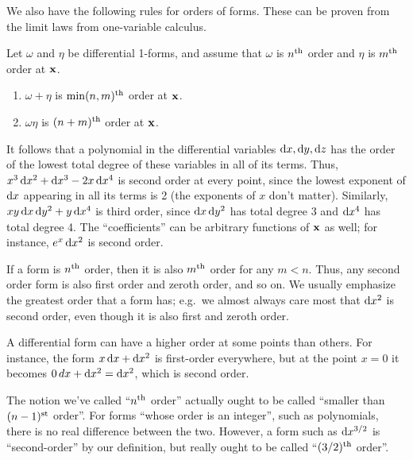 \documentclass[12pt]{amsart}
\begin{document}
We also have the following rules for orders of forms.
These can be proven from the limit laws from one-variable calculus.

\begin{thm}
  Let $\omega$ and $\eta$ be differential 1-forms, and assume that $\omega$ is $n^{\mathrm{th}}$ order and $\eta$ is $m^{\mathrm{th}}$ order at $\mathbf{x}$.
  \begin{enumerate}
  \item $\omega+\eta$ is $\min(n,m)^{\mathrm{th}}$ order at $\mathbf{x}$.
  \item $\omega\eta$ is $(n+m)^{\mathrm{th}}$ order at $\mathbf{x}$.
  \end{enumerate}
\end{thm}

It follows that a polynomial in the differential variables $\mathrm{d} x,\mathrm{d} y,\mathrm{d} z$ has the order of the lowest total degree of these variables in all of its terms.
Thus, $x^3\, \mathrm{d} x^2 + \mathrm{d} x^3 - 2x \,\mathrm{d} x^4$ is second order at every point, since the lowest exponent of $\mathrm{d} x$ appearing in all its terms is 2 (the exponents of $x$ don't matter).
Similarly, $xy\,\mathrm{d} x\,\mathrm{d} y^2 + y\, \mathrm{d} x^4$ is third order, since $\mathrm{d} x\,\mathrm{d} y^2$ has total degree 3 and $\mathrm{d} x^4$ has total degree 4.
The ``coefficients'' can be arbitrary functions of $\mathbf{x}$ as well; for instance, $e^x \,\mathrm{d} x^2$ is second order.

\begin{rmk}
  If a form is $n^{\mathrm{th}}$ order, then it is also $m^{\mathrm{th}}$ order for any $m<n$.
  Thus, any second order form is also first order and zeroth order, and so on.
  We usually emphasize the greatest order that a form has; e.g.\ we almost always care most that $\mathrm{d} x^2$ is second order, even though it is also first and zeroth order.
\end{rmk}

\begin{eg}
  A differential form can have a higher order at some points than others.
  For instance, the form $x \,\mathrm{d} x + \mathrm{d} x^2$ is first-order everywhere, but at the point $x=0$ it becomes $0\, dx + \mathrm{d} x^2 = \mathrm{d} x^2$, which is second order.
\end{eg}

\begin{adv}
  The notion we've called ``$n^{\mathrm{th}}$ order'' actually ought to be called ``smaller than $(n-1)^{\mathrm{st}}$ order''.
  For forms ``whose order is an integer'', such as polynomials, there is no real difference between the two.
  However, a form such as $\mathrm{d} x^{3/2}$ is ``second-order'' by our definition, but really ought to be called ``$(3/2)^{\mathrm{th}}$ order''.
\end{adv}
\end{document}
